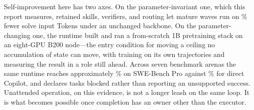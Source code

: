 \documentclass[10pt,letterpaper]{article}
\begin{document}
\begin{abstractbox}
Self-improvement here has two axes. On the parameter-invariant one, which this report
measures, retained skills, verifiers, and routing let mature waves run on
\SWEProTokenReduction\% fewer solve input Tokens under an unchanged backbone. On the
parameter-changing one, the runtime built and ran a from-scratch 1B pretraining stack
on an eight-GPU B200 node---the entry condition for moving a ceiling no accumulation
of state can move, with training on its own trajectories and measuring the result in
a role still ahead. Across seven benchmark arenas the same runtime reaches
approximately \SWEProArgusAccuracy\% on SWE-Bench Pro against
\SWEProDirectAccuracy\% for direct Copilot, and declares \ReviewerFirstBlocked{}
tasks blocked rather than reporting an unsupported success. Unattended operation, on
this evidence, is not a longer leash on the same loop. It is what becomes possible
once completion has an owner other than the executor.
\end{abstractbox}

\end{document}
